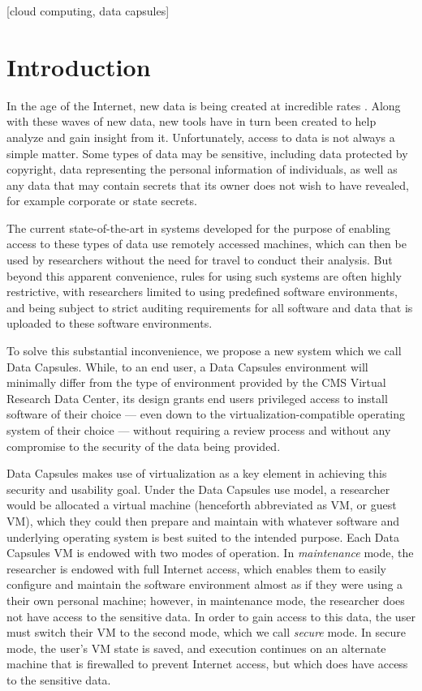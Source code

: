 \documentclass{acm_proc_article-sp}
\begin{document}
[cloud computing, data capsules]


\section{Introduction}

In the age of the Internet, new data is being created at incredible rates
\cite{digital-universe}.  Along with these waves of new data, new tools have
in turn been created to help analyze and gain insight from it. Unfortunately,
access to data is not always a simple matter.  Some types of data may be
sensitive, including data protected by copyright, data representing the personal
information of individuals, as well as any data that may contain secrets that
its owner does not wish to have revealed, for example corporate or state secrets.

The current state-of-the-art \cite{vrdc} in systems developed for the purpose
of enabling access to these types of data use remotely accessed machines, which
can then be used by researchers without the need for travel to conduct their
analysis. But beyond this apparent convenience, rules for using such systems
are often highly restrictive, with researchers limited to using predefined
software environments, and being subject to strict auditing requirements for
all software and data that is uploaded to these software environments.  

To solve this substantial inconvenience, we propose a new system which we call
Data Capsules.  While, to an end user, a Data Capsules environment will
minimally differ from the type of environment provided by the CMS Virtual
Research Data Center, its design grants end users privileged access to install
software of their choice --- even down to the virtualization-compatible
operating system of their choice --- without requiring a review process and
without any compromise to the security of the data being provided.

Data Capsules makes use of virtualization as a key element in achieving this
security and usability goal.  Under the Data Capsules use model, a researcher
would be allocated a virtual machine (henceforth abbreviated as VM, or guest
VM), which they could then prepare and maintain with whatever software and
underlying operating system is best suited to the intended purpose.  Each Data
Capsules VM is endowed with two modes of operation.  In \emph{maintenance} mode,
the researcher is endowed with full Internet access, which enables them to
easily configure and maintain the software environment almost as if they were
using a their own personal machine; however, in maintenance mode, the researcher
does not have access to the sensitive data.  In order to gain access to this
data, the user must switch their VM to the second mode, which we call
\emph{secure} mode.  In secure mode, the user's VM state is saved, and
execution continues on an alternate machine that is firewalled to prevent
Internet access, but which does have access to the sensitive data.
\end{document}
